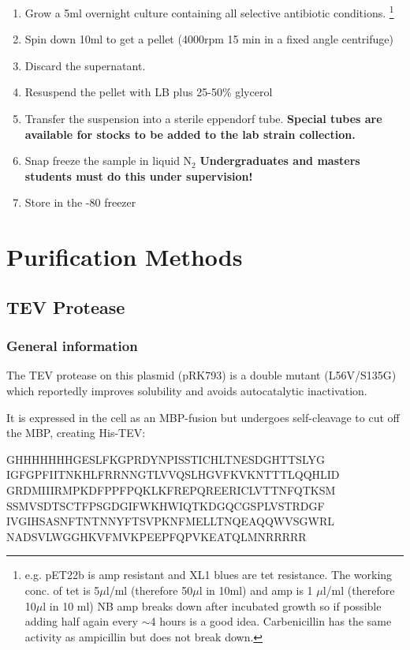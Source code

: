 \documentclass{tufte-book} %
\begin{document}
\begin{enumerate}
\item Grow a 5ml overnight culture containing all selective antibiotic conditions. \footnote{e.g. pET22b is amp resistant and XL1 blues are tet resistance. The working conc. of tet is 5$\mu$l/ml (therefore 50$\mu$l in 10ml) and amp is 1 $\mu$l/ml (therefore 10$\mu$l in 10 ml) NB amp breaks down after incubated growth so if possible adding half again every $\sim$4 hours is a good idea. Carbenicillin has the same activity as ampicillin but does not break down.}
\item Spin down 10ml to get a pellet (4000rpm 15 min in a fixed angle centrifuge)
\item  Discard the supernatant.
\item  Resuspend the pellet with LB plus 25-50\% glycerol
\item Transfer the suspension into a sterile eppendorf tube. \textbf{Special tubes are available for stocks to be added to the lab strain collection.}
\item Snap freeze the sample in liquid N$_{2}$ \textbf{Undergraduates and masters students must do this under supervision!}
\item Store in the -80 freezer
\end{enumerate}

\chapter{Purification Methods}

\section{TEV Protease}

\subsection{General information}

The TEV protease on this plasmid (pRK793) is a double mutant (L56V/S135G) which reportedly improves solubility and avoids autocatalytic inactivation.

It is expressed in the cell as an MBP-fusion but undergoes self-cleavage to cut off the MBP, creating His-TEV:

GHHHHHHHGESLFKGPRDYNPISSTICHLTNESDGHTTSLYG
IGFGPFIITNKHLFRRNNGTLVVQSLHGVFKVKNTTTLQQHLID
GRDMIIIRMPKDFPPFPQKLKFREPQREERICLVTTNFQTKSM
SSMVSDTSCTFPSGDGIFWKHWIQTKDGQCGSPLVSTRDGF
IVGIHSASNFTNTNNYFTSVPKNFMELLTNQEAQQWVSGWRL
NADSVLWGGHKVFMVKPEEPFQPVKEATQLMNRRRRR
\end{document}
